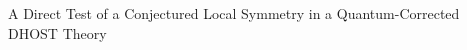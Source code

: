 \documentclass[twocolumn]{aastex631}
\begin{document}
A Direct Test of a Conjectured Local Symmetry in a Quantum-Corrected DHOST Theory
\end{document}
